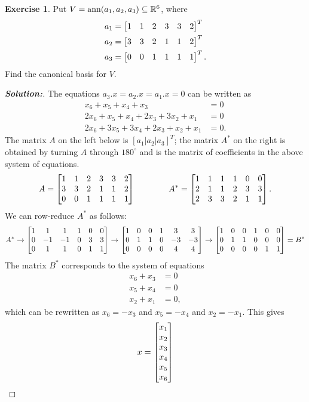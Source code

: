 \documentclass[a4paper]{amsart}
\theoremstyle{definition}
\newtheorem{exercise}{Exercise}
\newenvironment{solution}{\begin{proof}[\textbf{Solution:}] \vphantom{u}}{\end{proof}}
\begin{document}
\begin{exercise}\label{ex-ann-canonical-i}
 Put $V=\operatorname{ann}(a_1,a_2,a_3)\subseteq{\mathbb{R}}^6$, where 
 \begin{align*}
  a_1 &= \left[\begin{matrix} 1&1&2&3&3&2 \end{matrix}\right]^T \\
  a_2 &= \left[\begin{matrix} 3&3&2&1&1&2 \end{matrix}\right]^T \\
  a_3 &= \left[\begin{matrix} 0&0&1&1&1&1 \end{matrix}\right]^T.
 \end{align*}
 Find the canonical basis for $V$.
\end{exercise}
\begin{solution}
 The equations $a_3.x=a_2.x=a_1.x=0$ can be written as
 \begin{align*}
  x_6+x_5+x_4+x_3 &= 0 \\
  2x_6+x_5+x_4+2x_3+3x_2+x_1 &= 0 \\
  2x_6+3x_5+3x_4+2x_3+x_2+x_1 &= 0.
 \end{align*}
 The matrix $A$ on the left below is $[a_1|a_2|a_3]^T$; the matrix
 $A^*$ on the right is obtained by turning $A$ through $180^\circ$ and
 is the matrix of coefficients in the above system of equations.
 \[ 
  A   = \left[\begin{matrix} 1&1&2&3&3&2 \\
             3&3&2&1&1&2 \\
             0&0&1&1&1&1 \end{matrix}\right] \hspace{4em}
  A^* = \left[\begin{matrix} 1&1&1&1&0&0 \\
             2&1&1&2&3&3 \\
             2&3&3&2&1&1 \end{matrix}\right].
 \]
 We can row-reduce $A^*$ as follows:
 \[ A^* \to 
     \left[\begin{matrix} 1&1&1&1&0&0 \\
          0&-1&-1&0&3&3 \\
          0&1&1&0&1&1 \end{matrix}\right]
     \to 
     \left[\begin{matrix} 1&0&0&1&3&3 \\
          0&1&1&0&-3&-3 \\
          0&0&0&0&4&4 \end{matrix}\right]
     \to 
     \left[\begin{matrix} 1&0&0&1&0&0 \\
          0&1&1&0&0&0 \\
          0&0&0&0&1&1 \end{matrix}\right]
    = B^*
 \]
 The matrix $B^*$ corresponds to the system of equations 
 \begin{align*}
  x_6+x_3 &= 0 \\
  x_5+x_4 &= 0 \\
  x_2+x_1 &= 0,
 \end{align*}
 which can be rewritten as $x_6=-x_3$ and $x_5=-x_4$ and $x_2=-x_1$.
 This gives
 \[ x = \left[\begin{matrix} x_1\\ x_2 \\ x_3 \\ x_4 \\ x_5 \\ x_6 \end{matrix}\right] 
\]
\end{solution}
\end{document}
